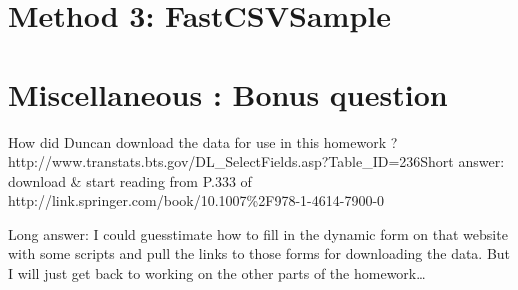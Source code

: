 \documentclass[letterpaper,10pt,english]{/usr/local/lib/python2.7/dist-packages/sphinx/texinputs/sphinxhowto}
\begin{document}
\section{Method 3: FastCSVSample}\section{Miscellaneous : Bonus question}How did Duncan download the data for use in this homework ?
http://www.transtats.bts.gov/DL\_SelectFields.asp?Table\_ID=236Short answer: download \& start reading from P.333 of
http://link.springer.com/book/10.1007\%2F978-1-4614-7900-0

Long answer: I could guesstimate how to fill in the dynamic form on that
website with some scripts and pull the links to those forms for
downloading the data. But I will just get back to working on the other
parts of the homework\ldots{}
        

        \renewcommand{\indexname}{Index}
        \printindex

    
\end{document}
